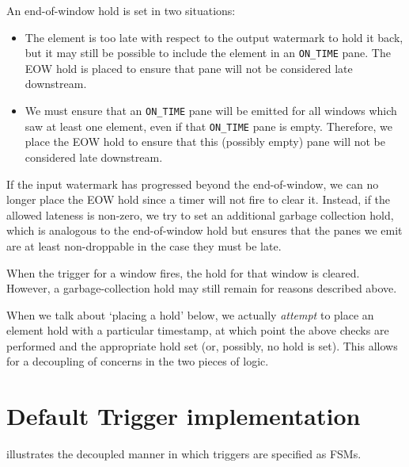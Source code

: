 \newpage
An end-of-window hold is set in two situations:
\begin{itemize}
	\item The element is too late with respect to the output watermark to hold it back, but it may still be possible to include the element in an \verb|ON_TIME| pane.
	The EOW hold is placed to ensure that pane will not be considered late downstream.
	\item We must ensure that an \verb|ON_TIME| pane will be emitted for all windows which saw at least one element, even if that \verb|ON_TIME| pane is empty.
	Therefore, we place the EOW hold to ensure that this (possibly empty) pane will not be considered late downstream.
\end{itemize}

If the input watermark has progressed beyond the end-of-window, we can no longer place the EOW hold since a timer will not fire to clear it.
Instead, if the allowed lateness is non-zero, we try to set an additional garbage collection hold, which is analogous to the end-of-window hold but ensures that the panes we emit are at least non-droppable in the case they must be late.

When the trigger for a window fires, the hold for that window is cleared.
However, a garbage-collection hold may still remain for reasons described above.

When we talk about `placing a hold' below, we actually \emph{attempt} to place an element hold with a particular timestamp, at which point the above checks are performed and the appropriate hold set (or, possibly, no hold is set).
This allows for a decoupling of concerns in the two pieces of logic.

\section{Default Trigger implementation}\label{apx:additional:example-default-trigger}

 illustrates the decoupled manner in which triggers are specified as FSMs.

